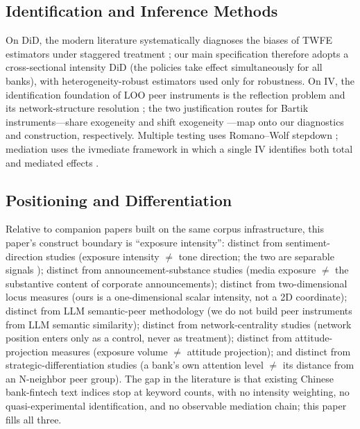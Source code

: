 \subsection{Identification and Inference Methods}
On DiD, the modern literature systematically diagnoses the biases of TWFE
estimators under staggered treatment
\parencite{baker2022staggered,callaway2021difference,sun2021estimating}; our
main specification therefore adopts a cross-sectional intensity DiD (the
policies take effect simultaneously for all banks), with
heterogeneity-robust estimators used only for robustness. On IV, the
identification foundation of LOO peer instruments is the reflection problem
\parencite{manski1993reflection} and its network-structure resolution
\parencite{bramoulle2009peer}; the two justification routes for Bartik
instruments---share exogeneity \parencite{goldsmith2020bartik} and shift
exogeneity \parencite{borusyak2022shiftshare}---map onto our diagnostics and
construction, respectively. Multiple testing uses Romano--Wolf stepdown
\parencite{romanowolf2005snooping}; mediation uses the ivmediate framework in
which a single IV identifies both total and mediated effects
\parencite{dippel2020ivmediate}.

\subsection{Positioning and Differentiation}
Relative to companion papers built on the same corpus infrastructure, this
paper's construct boundary is ``exposure intensity'': distinct from
sentiment-direction studies (exposure intensity $\neq$ tone direction; the two
are separable signals \parencite{cookson2024social}); distinct from
announcement-substance studies (media exposure $\neq$ the substantive content
of corporate announcements); distinct from two-dimensional locus measures
(ours is a one-dimensional scalar intensity, not a 2D coordinate); distinct
from LLM semantic-peer methodology (we do not build peer instruments from LLM
semantic similarity); distinct from network-centrality studies (network
position enters only as a control, never as treatment); distinct from
attitude-projection measures (exposure volume $\neq$ attitude projection); and
distinct from strategic-differentiation studies (a bank's own attention level
$\neq$ its distance from an N-neighbor peer group). The gap in the literature
is that existing Chinese bank-fintech text indices stop at keyword counts,
with no intensity weighting, no quasi-experimental identification, and no
observable mediation chain; this paper fills all three.

